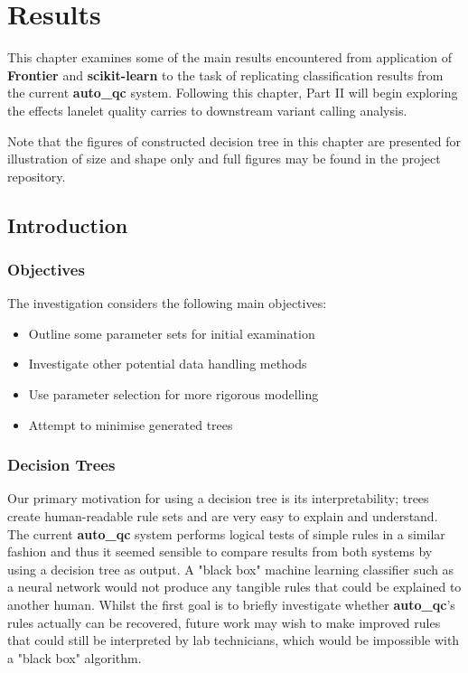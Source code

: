 \chapter{Results}
\label{chap:p1-results}
\ifpdf
    \graphicspath{{Chapter4/Figs/Raster/}{Chapter4/Figs/PDF/}{Chapter4/Figs/}}
\else
    \graphicspath{{Chapter4/Figs/Vector/}{Chapter4/Figs/}}
\fi

This chapter examines some of the main results encountered from application of
\textbf{Frontier} and \textbf{scikit-learn} to the task of replicating
classification results from the current \textbf{auto\_qc} system.
Following this chapter, Part II will begin exploring the effects lanelet quality
carries to downstream variant calling analysis.

Note that the figures of constructed decision tree in this chapter are presented
for illustration of size and shape only and full figures may be found in the
project repository\citep{github:frontier}.


\section{Introduction}
\subsection{Objectives}

The investigation considers the following main objectives:

\begin{itemize}
    \item Outline some parameter sets for initial examination
    \item Investigate other potential data handling methods
    \item Use parameter selection for more rigorous modelling
    \item Attempt to minimise generated trees
\end{itemize}

\subsection{Decision Trees}

Our primary motivation for using a decision tree is its interpretability; trees
create human-readable rule sets and are very easy to explain and understand. The
current \textbf{auto\_qc} system performs logical tests of simple rules in a
similar fashion and thus it seemed sensible to compare results from both systems
by using a decision tree as output. A "black box" machine learning
classifier such as a neural network would not produce any tangible rules that
could be explained to another human. Whilst the first goal is to briefly
investigate whether \textbf{auto\_qc}'s rules actually can be recovered, future work may
wish to make improved rules that could still be interpreted by lab technicians,
which would be impossible with a "black box" algorithm.

